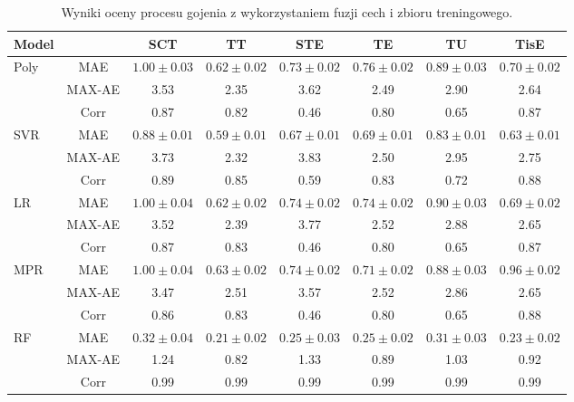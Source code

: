 \begin{table}[h]
	\caption{Wyniki oceny procesu gojenia z wykorzystaniem fuzji cech i zbioru treningowego.}
	\scriptsize
	\begin{center}
		\begin{tabular}{lc||c|c|c|c|c|c}
			\textbf{Model} & & \textbf{SCT} & \textbf{TT} & \textbf{STE} & \textbf{TE} & \textbf{TU} & \textbf{TisE}\\ 
			
			\hline
			\multirow{3}{*}{Poly}
			& MAE & $1.00\pm0.03$ & $0.62\pm0.02$ & $0.73\pm0.02$ & $0.76\pm0.02$ & $0.89\pm0.03$ & $0.70\pm0.02$\\
			& MAX-AE & 3.53 & 2.35 & 3.62 & 2.49 & 2.90 & 2.64 \\
			& Corr   & 0.87 & 0.82 & 0.46 & 0.80 & 0.65 & 0.87 \\
			\hline
			\multirow{3}{*}{SVR}
			& MAE & $0.88\pm0.01$ & $0.59\pm0.01$ & $0.67\pm0.01$ & $0.69\pm0.01$ & $0.83\pm0.01$ & $0.63\pm0.01$\\
			& MAX-AE & 3.73 & 2.32 & 3.83 & 2.50 & 2.95 & 2.75 \\
			& Corr   & 0.89 & 0.85 & 0.59 & 0.83 & 0.72 & 0.88 \\
			\hline
			\multirow{3}{*}{LR}
			& MAE & $1.00\pm0.04$ & $0.62\pm0.02$ & $0.74\pm0.02$ & $0.74\pm0.02$ & $0.90\pm0.03$ & $0.69\pm0.02$\\
			& MAX-AE & 3.52 & 2.39 & 3.77 & 2.52 & 2.88 & 2.65 \\
			& Corr   & 0.87 & 0.83 & 0.46 & 0.80 & 0.65 & 0.87 \\
			\hline
			\multirow{3}{*}{MPR}
			& MAE & $1.00\pm0.04$ & $0.63\pm0.02$ & $0.74\pm0.02$ & $0.71\pm0.02$ & $0.88\pm0.03$ & $0.96\pm0.02$\\
			& MAX-AE & 3.47 & 2.51 & 3.57 & 2.52 & 2.86 & 2.65 \\
			& Corr   & 0.86 & 0.83 & 0.46 & 0.80 & 0.65 & 0.88 \\
			\hline
			 \multirow{3}{*}{RF}
			 & MAE & $0.32\pm0.04$ & $0.21\pm0.02$ & $0.25\pm0.03$ & $0.25\pm0.02$ & $0.31\pm0.03$ & $0.23\pm0.02$\\
			 & MAX-AE & 1.24 & 0.82 & 1.33 & 0.89 & 1.03 & 0.92 \\
			 & Corr   & 0.99 & 0.99 & 0.99 & 0.99 & 0.99 & 0.99 \\
			 \hline
		\end{tabular}
	\end{center}
	\label{tab:trainset}
\end{table}

